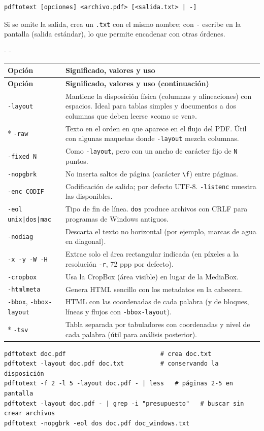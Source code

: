 \documentclass[11pt,a4paper]{article}
\makeatletter
\newcommand{\necesitaespacio}[1]{\par\penalty-100\begingroup
	\setlength{\dimen@}{#1}\dimen@ii\pagegoal\advance\dimen@ii-\pagetotal
	\ifdim\dimen@>\dimen@ii\ifdim\dimen@ii>\z@\vfil\fi\penalty-\@M\fi\endgroup}
\newenvironment{opciones}[1][Opción]{%
	\par\begingroup\small
	\begin{longtable}{L{4.25cm}L{11.2cm}}
		\toprule\rowcolor{tablacab}\cab{#1} & \cab{Significado, valores y uso} \\ \midrule
		\endfirsthead
		\toprule\rowcolor{tablacab}\cab{#1} & \cab{Significado, valores y uso (continuación)} \\ \midrule
		\endhead
		\bottomrule
		\endfoot}
	{\end{longtable}\endgroup}
\newcommand{\opt}[1]{\texttt{\textcolor{colopt}{#1}}}      %
\newcommand{\arch}[1]{\texttt{\textcolor{colarch}{#1}}}    %
\newcommand{\val}[1]{\texttt{#1}}                          %
\newcommand{\cab}[1]{\textbf{#1}}
\newcommand{\bs}{\textbackslash{}}    %
\makeatother
\begin{document}
	\begin{lstlisting}[style=sintaxis]
pdftotext [opciones] <archivo.pdf> [<salida.txt> | -]
\end{lstlisting}
	
	Si se omite la salida, crea un \arch{.txt} con el mismo nombre; con \val{-} escribe en la pantalla (salida estándar), lo que permite encadenar con otras órdenes.
	
	\necesitaespacio{10\baselineskip}
	\begin{opciones}
		\opt{-layout} & Mantiene la disposición física (columnas y alineaciones) con espacios. Ideal para tablas simples y documentos a dos columnas que deben leerse «como se ven».\\*
		\opt{-raw} & Texto en el orden en que aparece en el flujo del PDF. Útil con algunas maquetas donde \opt{-layout} mezcla columnas.\\
		\opt{-fixed N} & Como \opt{-layout}, pero con un ancho de carácter fijo de \val{N} puntos.\\
		\opt{-nopgbrk} & No inserta saltos de página (carácter \val{\bs{}f}) entre páginas.\\
		\opt{-enc CODIF} & Codificación de salida; por defecto UTF-8. \opt{-listenc} muestra las disponibles.\\
		\opt{-eol unix|\allowbreak{}dos|\allowbreak{}mac} & Tipo de fin de línea. \val{dos} produce archivos con CRLF para programas de Windows antiguos.\\
		\opt{-nodiag} & Descarta el texto no horizontal (por ejemplo, marcas de agua en diagonal).\\
		\opt{-x -y -W -H} & Extrae solo el área rectangular indicada (en píxeles a la resolución \opt{-r}, 72 ppp por defecto).\\
		\opt{-cropbox} & Usa la CropBox (área visible) en lugar de la MediaBox.\\
		\opt{-htmlmeta} & Genera HTML sencillo con los metadatos en la cabecera.\\
		\opt{-bbox}, \opt{-bbox-layout} & HTML con las coordenadas de cada palabra (y de bloques, líneas y flujos con \opt{-bbox-layout}).\\*
		\opt{-tsv} & Tabla separada por tabuladores con coordenadas y nivel de cada palabra (útil para análisis posterior).\\
	\end{opciones}
	
	\begin{lstlisting}
pdftotext doc.pdf                          # crea doc.txt
pdftotext -layout doc.pdf doc.txt          # conservando la disposición
pdftotext -f 2 -l 5 -layout doc.pdf - | less   # páginas 2-5 en pantalla
pdftotext -layout doc.pdf - | grep -i "presupuesto"   # buscar sin crear archivos
pdftotext -nopgbrk -eol dos doc.pdf doc_windows.txt
\end{lstlisting}
	
\end{document}
